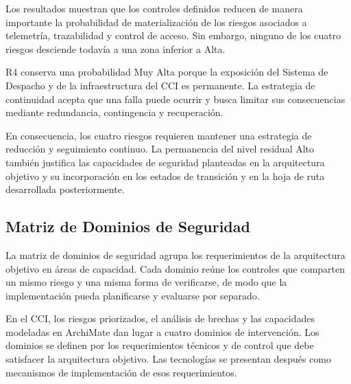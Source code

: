 Los resultados muestran que los controles definidos reducen de manera importante la
probabilidad de materialización de los riesgos asociados a telemetría, trazabilidad y control
de acceso. Sin embargo, ninguno de los cuatro riesgos desciende todavía a una zona inferior a
Alta.

R4 conserva una probabilidad Muy Alta porque la exposición del Sistema de Despacho y de la infraestructura del CCI es permanente. La estrategia de continuidad acepta que una falla puede ocurrir y busca limitar sus consecuencias mediante redundancia, contingencia y recuperación.

En consecuencia, los cuatro riesgos requieren mantener una estrategia de reducción y
seguimiento continuo. La permanencia del nivel residual Alto también justifica las capacidades
de seguridad planteadas en la arquitectura objetivo y su incorporación en los estados de
transición y en la hoja de ruta desarrollada posteriormente.


\subsection{Matriz de Dominios de Seguridad}

La matriz de dominios de seguridad agrupa los requerimientos de la arquitectura objetivo en áreas de capacidad. Cada dominio reúne los controles que comparten un mismo riesgo y una misma forma de verificarse, de modo que la implementación pueda planificarse y evaluarse por separado.

En el CCI, los riesgos priorizados, el análisis de brechas y las capacidades modeladas en ArchiMate \parencite{archimate2022,modeloArchimateCCI2026} dan lugar a cuatro dominios de intervención. Los dominios se definen por los requerimientos técnicos y de control que debe satisfacer la arquitectura objetivo. Las tecnologías se presentan después como mecanismos de implementación de esos requerimientos.

